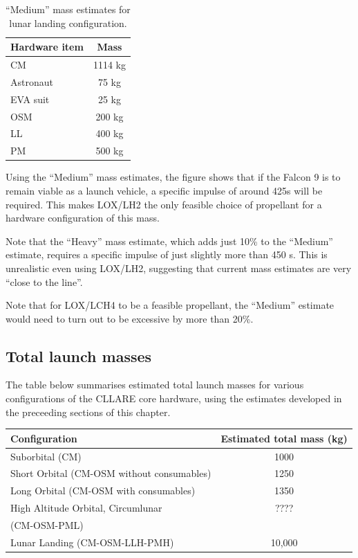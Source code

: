 \documentclass{report}
\begin{document}
\begin{table} \label{tab:fuel_analysis}
\centering
\caption{``Medium'' mass estimates for lunar landing configuration.}
\begin{tabular}{ | l | c | }
\hline
\textbf{Hardware item} & \textbf{Mass} \\
\hline
\hline
CM		& 1114 kg \\
\hline
Astronaut	& 75 kg \\
\hline
EVA suit	& 25 kg \\
\hline
OSM		& 200 kg \\
\hline
LL		& 400 kg \\
\hline
PM		& 500 kg \\
\hline
\end{tabular}
\end{table}

Using the ``Medium'' mass estimates, the figure shows that if the Falcon 9 is to remain viable as a launch vehicle, a specific impulse of around 425s will be required.  This makes LOX/LH2 the only feasible choice of propellant for a hardware configuration of this mass.

Note that the ``Heavy'' mass estimate, which adds just 10\% to the ``Medium'' estimate, requires a specific impulse of just slightly more than 450 s.  This is unrealistic even using LOX/LH2, suggesting that current mass estimates are very ``close to the line''.

Note that for LOX/LCH4 to be a feasible propellant, the ``Medium'' estimate would need to turn out to be excessive by more than 20\%.

\subsection{Total launch masses}

The table below summarises estimated total launch masses for various configurations of the CLLARE core hardware, using the estimates developed in the preceeding sections of this chapter.

\begin{tabular}{ | l | c | }
\hline
Configuration & Estimated total mass (kg) \\
\hline
\hline
Suborbital (CM) & 1000 \\
\hline
Short Orbital (CM-OSM without consumables) & 1250 \\
\hline
Long Orbital (CM-OSM with consumables) & 1350 \\
\hline
High Altitude Orbital, Circumlunar & ???? \\
(CM-OSM-PML) & \\
\hline
Lunar Landing (CM-OSM-LLH-PMH) & 10,000 \\
\hline
\end{tabular}
\end{document}

